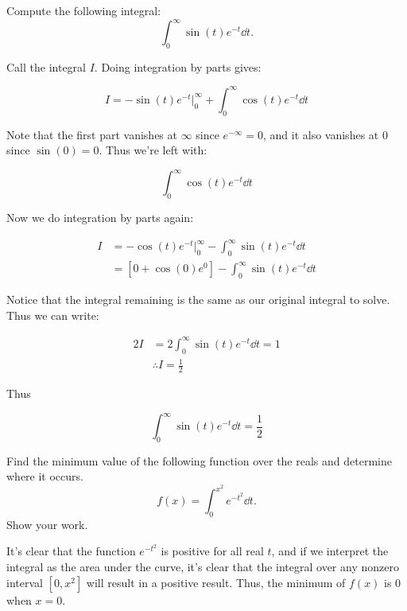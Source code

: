 \documentclass[11pt]{article}
\begin{document}
\begin{Parts}
    \Part Compute the following integral:
        \[
            \int_0^{\infty} \sin(t)e^{-t} \dd{t}.
        \]
    
    \begin{solution}
        Call the integral $I$. Doing integration by parts gives:

           \[ I = -\sin(t)e^{-t}\bigg\rvert_0^\infty + \int_0^\infty \cos(t)e^{-t}\dd{t}\]

           Note that the first part vanishes at $\infty$ since $e^{-\infty} = 0$, and it also vanishes at $0$ since $\sin(0) = 0$. Thus we're left with:

           \[ \int_0^\infty \cos(t) e^{-t} \dd t\]

           Now we do integration by parts again: 


            \begin{align*}
                I &= -\cos(t)e^{-t} \bigg\rvert_0^\infty - \int_0^\infty \sin(t)e^{-t} \dd t\\
                &= [0 + \cos(0) e^0] - \int_0^\infty \sin(t) e^{-t} \dd t
            \end{align*}

            Notice that the integral remaining is the same as our original integral to solve. Thus we can write:

            \begin{align*}
                2I &= 2 \int_0^\infty \sin(t) e^{-t} \dd t = 1\\
                &\therefore \boxed{I = \frac{1}{2}}
            \end{align*}

            Thus

            \[ \int_0^\infty \sin(t) e^{-t} \dd t = \frac{1}{2}\]
    \end{solution}
    \Part Find the minimum value of the following function over the reals and determine where it occurs.
    \[f(x) = \int_{0}^{x^2} e^{-t^2} \dd{t}.\]
    Show your work.

    \begin{solution}
        It's clear that the function $e^{-t^2}$ is positive for all real $t$, and if we interpret the integral as the area under the curve, it's clear that the integral over any nonzero interval $[0, x^2]$ will result in a positive result. Thus, the minimum of $f(x)$ is 0 when $x = 0$.
    \end{solution}


\end{Parts}
\end{document}
